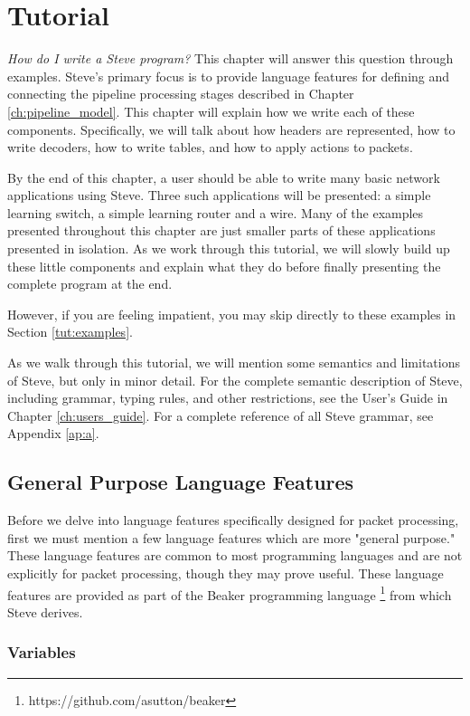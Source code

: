 \chapter{Tutorial} \label{ch:tutorial}

\textit{How do I write a Steve program?} This chapter will answer this question through examples. Steve's primary focus is to provide language features for defining and connecting the pipeline processing stages described in Chapter \ref{ch:pipeline_model}. This chapter will explain how we write each of these components. Specifically, we will talk about how headers are represented, how to write decoders, how to write tables, and how to apply actions to packets.

By the end of this chapter, a user should be able to write many basic network applications using Steve. Three such applications will be presented: a simple learning switch, a simple learning router and a wire. Many of the examples presented throughout this chapter are just smaller parts of these applications presented in isolation. As we work through this tutorial, we will slowly build up these little components and explain what they do before finally presenting the complete program at the end.  

However, if you are feeling impatient, you may skip directly to these examples in Section \ref{tut:examples}.

As we walk through this tutorial, we will mention some semantics and limitations of Steve, but only in minor detail. For the complete semantic description of Steve, including grammar, typing rules, and other restrictions, see the User's Guide in Chapter \ref{ch:users_guide}. For a complete reference of all Steve grammar, see Appendix \ref{ap:a}.

\section{General Purpose Language Features} \label{tut:gen_purp}

Before we delve into language features specifically designed for packet processing, first we must mention a few language features which are more "general purpose." These language features are common to most programming languages and are not explicitly for packet processing, though they may prove useful. These language features are provided as part of the Beaker programming language \footnote{https://github.com/asutton/beaker} from which Steve derives.

\subsection{Variables} \label{tut:variable}

